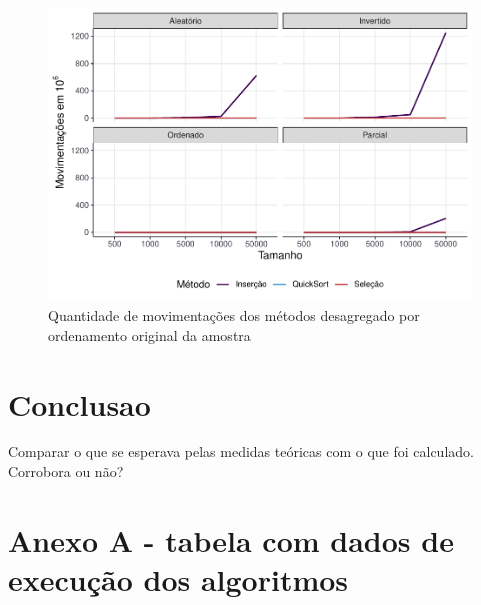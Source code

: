 \documentclass[
]{article}
\begin{document}
\begin{figure}

{\centering \includegraphics[width=0.75\linewidth]{relatorio_tp1_2_files/figure-latex/grafico-movimentacoes-1} 

}

\caption{Quantidade de movimentações dos métodos desagregado por ordenamento original da amostra}\label{fig:grafico-movimentacoes}
\end{figure}

\hypertarget{conclusao}{%
\section{Conclusao}\label{conclusao}}

Comparar o que se esperava pelas medidas teóricas com o que foi
calculado. Corrobora ou não?

\hypertarget{anexo-a---tabela-com-dados-de-execuuxe7uxe3o-dos-algoritmos}{%
\section*{Anexo A - tabela com dados de execução dos
algoritmos}\label{anexo-a---tabela-com-dados-de-execuuxe7uxe3o-dos-algoritmos}}
\end{document}
